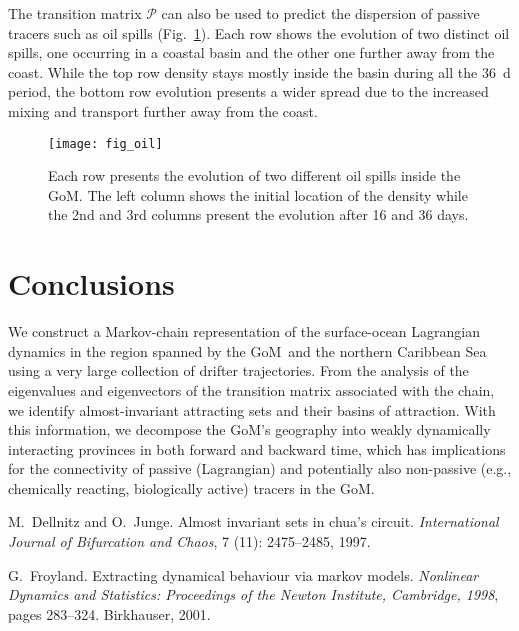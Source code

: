 \documentclass[final]{beamer}
\newcommand{\PF}{\mathcal{P}}
\newcommand{\gom}{GoM}
\begin{document}
\begin{frame}[t]
\begin{multicols}{3}
The transition matrix $\PF$ can also be used to predict the dispersion of
passive tracers such as oil spills (Fig.~\ref{fig:oil}). Each row shows the
evolution of  two distinct oil spills, one occurring in a coastal basin and the
other one further away from the coast. While the top row density stays mostly
inside the basin during all the \SI{36}{d} period, the bottom row evolution
presents a wider spread due to the increased mixing and transport further away
from the coast.

\begin{figure}
\centering
\texttt{[image: fig\_oil]}
\caption{Each row presents the evolution of two different oil spills inside the
\gom. The left column shows the initial location of the density while the 2nd
and 3rd columns present the evolution after 16 and 36 days.}
\label{fig:oil}
\end{figure}

\section{Conclusions}
We construct a Markov-chain representation of the surface-ocean Lagrangian
dynamics in the region spanned by the \gom\ and the northern Caribbean Sea
using a very large collection of drifter trajectories. From the analysis of the
eigenvalues and eigenvectors of the transition matrix associated with the
chain, we identify almost-invariant attracting sets and their basins of
attraction. With this information, we decompose the GoM's geography into weakly
dynamically interacting provinces in both forward and backward time, which has
implications for the connectivity of passive (Lagrangian) and potentially also
non-passive (e.g., chemically reacting, biologically active) tracers in the
\gom.


\begingroup
\renewcommand{\section}[2]{}%
\begin{thebibliography}{5}

M.~Dellnitz and O.~Junge.
\newblock Almost invariant sets in chua's circuit.
\newblock \emph{International Journal of Bifurcation and Chaos}, 7
  (11): 2475--2485, 1997.

G.~Froyland.
\newblock Extracting dynamical behaviour via markov models.
\newblock \emph{Nonlinear Dynamics and Statistics:
  Proceedings of the Newton Institute, Cambridge, 1998}, pages 283--324.
  Birkhauser, 2001.


\end{thebibliography}
\end{multicols}
\end{frame}
\end{document}
